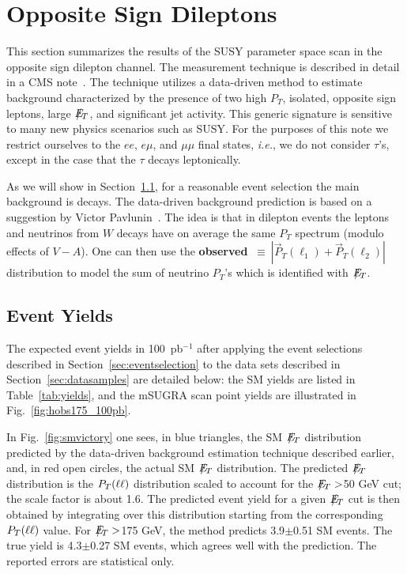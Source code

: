 \section{Opposite Sign Dileptons}
\label{sec:osstudies}

This section summarizes the results of the SUSY parameter space scan
in the opposite sign dilepton channel. The measurement technique is
described in detail in a CMS note~\cite{osnote}. The technique
utilizes a data-driven method to estimate background characterized
by the presence of two high $P_T$, isolated, opposite sign leptons,
large $E\!\!\!\!/_T$, and significant jet activity. This generic signature is
sensitive to many new physics scenarios such as SUSY.  For the purposes
of this note we restrict ourselves to the $ee$, $e\mu$, and $\mu\mu$
final states, {\em i.e.}, we do not consider $\tau$'s, except in the
case that the $\tau$ decays leptonically. 

As we will show in Section~\ref{sec:yields}, for a reasonable event
selection the main background is \ttbar decays. The data-driven
background prediction is based on a suggestion by Victor
Pavlunin~\cite{victor}. The idea is that in dilepton \ttbar events
the leptons and neutrinos from $W$ decays have on average the same
$P_T$ spectrum (modulo effects of $V-A$). One can then use the {\bf
observed} \ptll $~\equiv~|\vec{P}_T(\ell_1) + \vec{P}_T(\ell_2)|$
distribution to model the sum of neutrino $P_T$'s which is identified
with $E\!\!\!\!/_T$. 

\subsection{Event Yields}
\label{sec:yields}

The expected event yields in 100~pb$^{-1}$ after applying the event selections
described in Section~\ref{sec:eventselection} to the data sets described in
Section~\ref{sec:datasamples} are detailed below: the SM yields are listed in
Table~\ref{tab:yields}, and the mSUGRA scan point yields are illustrated in
Fig.~\ref{fig:hobs175_100pb}.

In Fig.~\ref{fig:smvictory} one sees, in blue triangles, the SM $E\!\!\!\!/_T$ distribution predicted
by the data-driven background estimation technique described earlier, and, in
red open circles, the actual SM $E\!\!\!\!/_T$ distribution. The predicted $E\!\!\!\!/_T$ distribution
is the $P_T(\ell\ell)$ distribution scaled to account for the $E\!\!\!\!/_T>$50 GeV cut; the scale
factor is about 1.6. The predicted event yield for a given $E\!\!\!\!/_T$ cut is then obtained by integrating
over this distribution starting from the corresponding $P_T(\ell\ell)$ value. For $E\!\!\!\!/_T>$175 GeV, the method predicts
3.9$\pm$0.51 SM events. The true yield is 4.3$\pm$0.27 SM events, which agrees
well with the prediction. The reported errors are statistical only.

